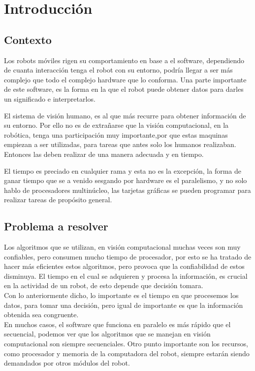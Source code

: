 \chapter{Introducción}

\section{Contexto}
Los robots móviles rigen su comportamiento en base a el software, dependiendo de cuanta interacción tenga el robot con su entorno, podría llegar a ser más complejo que todo el complejo hardware que lo conforma. Una parte importante de este software, es la forma en la que el robot puede obtener datos para darles un significado e interpretarlos. 

El sistema de visión humano, es al que más recurre para obtener información de su entorno. Por ello no es de extrañarse que la visión computacional, en la robótica, tenga una participación muy importante,por que estas maquinas empiezan a ser utilizadas, para tareas que antes solo los humanos realizaban. Entonces las deben realizar de una manera adecuada y en tiempo. 

El tiempo es preciado en cualquier rama y esta no es la excepción, la forma de ganar tiempo que se a venido sesgando por hardware es el paralelismo, y no solo hablo de procesadores multinúcleo, las tarjetas gráficas se pueden programar para realizar tareas de propósito general.   

\pagebreak

\section{Problema a resolver}
Los algoritmos que se utilizan, en visión computacional muchas veces son muy confiables, pero consumen mucho tiempo de procesador, por esto se ha tratado de hacer más eficientes estos algoritmos, pero provoca que  la confiabilidad de estos disminuya. El tiempo en el cual se adquieren y procesa la información, es crucial en la actividad de un robot, de esto depende que decisión tomara.\\

Con lo anteriormente dicho, lo importante es el tiempo en que procesemos los datos, para tomar una decisión, pero igual de importante es que la información obtenida sea congruente. \\

En muchos casos, el software que funciona en paralelo es más rápido que el secuencial, podemos ver que los algoritmos que se manejan en visión computacional son siempre secuenciales. Otro punto importante son los recursos, como procesador y memoria de la computadora del robot, siempre estarán siendo demandados por otros módulos del robot.    \\

